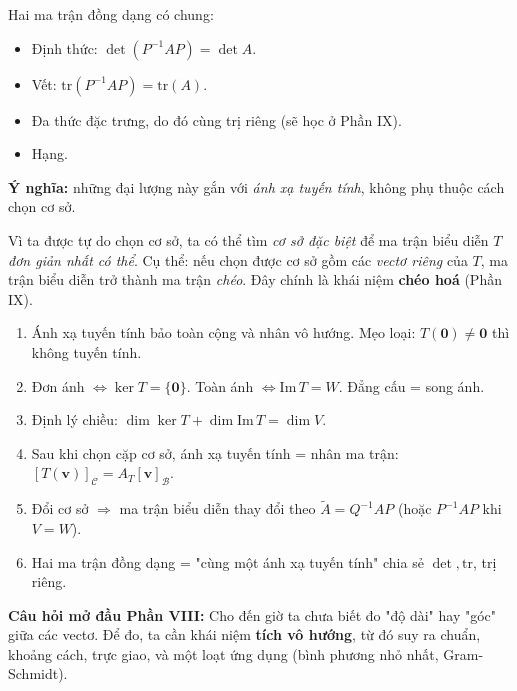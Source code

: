 \documentclass[12pt,a4paper]{article}
\begin{document}
\begin{tinhchat}[title={Bất biến đồng dạng}]
Hai ma trận đồng dạng có chung:
\begin{itemize}
  \item Định thức: $\det(P^{-1}AP) = \det A$.
  \item Vết: $\mathrm{tr}(P^{-1}AP) = \mathrm{tr}(A)$.
  \item Đa thức đặc trưng, do đó cùng trị riêng (sẽ học ở Phần IX).
  \item Hạng.
\end{itemize}
\textbf{Ý nghĩa:} những đại lượng này gắn với \emph{ánh xạ tuyến tính}, không phụ thuộc cách chọn cơ sở.
\end{tinhchat}

\begin{ynghia}[title={Tại sao đồng dạng quan trọng?}]
Vì ta được tự do chọn cơ sở, ta có thể tìm \emph{cơ sở đặc biệt} để ma trận biểu diễn $T$ \emph{đơn giản nhất có thể}. Cụ thể: nếu chọn được cơ sở gồm các \emph{vectơ riêng} của $T$, ma trận biểu diễn trở thành ma trận \emph{chéo}. Đây chính là khái niệm \textbf{chéo hoá} (Phần IX).
\end{ynghia}

\begin{tongket}[title={Tổng kết Phần VII}]
\begin{enumerate}
  \item Ánh xạ tuyến tính bảo toàn cộng và nhân vô hướng. Mẹo loại: $T(\mathbf{0}) \ne \mathbf{0}$ thì không tuyến tính.
  \item Đơn ánh $\Leftrightarrow \ker T = \{\mathbf{0}\}$. Toàn ánh $\Leftrightarrow \mathrm{Im}\,T = W$. Đẳng cấu = song ánh.
  \item Định lý chiều: $\dim\ker T + \dim\mathrm{Im}\,T = \dim V$.
  \item Sau khi chọn cặp cơ sở, ánh xạ tuyến tính = nhân ma trận: $[T(\mathbf{v})]_{\mathcal{C}} = A_T [\mathbf{v}]_{\mathcal{B}}$.
  \item Đổi cơ sở $\Rightarrow$ ma trận biểu diễn thay đổi theo $\widetilde{A} = Q^{-1} A P$ (hoặc $P^{-1}AP$ khi $V = W$).
  \item Hai ma trận đồng dạng = "cùng một ánh xạ tuyến tính" chia sẻ $\det, \mathrm{tr}$, trị riêng.
\end{enumerate}

\textbf{Câu hỏi mở đầu Phần VIII:} Cho đến giờ ta chưa biết đo "độ dài" hay "góc" giữa các vectơ. Để đo, ta cần khái niệm \textbf{tích vô hướng}, từ đó suy ra chuẩn, khoảng cách, trực giao, và một loạt ứng dụng (bình phương nhỏ nhất, Gram-Schmidt).
\end{tongket}
\end{document}

